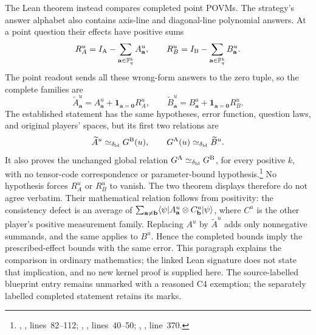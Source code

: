 \documentclass[11pt]{article}
\begin{document}
The Lean theorem instead compares completed point POVMs. The strategy's
answer alphabet also contains axis-line and diagonal-line polynomial
answers. At a point question their effects have positive sums
\[
 R_A^u=I_{\mathrm A}-\sum_{\mathbf a\in\mathbb{F}_q^k}A^u_{\mathbf a},
 \qquad
 R_B^u=I_{\mathrm B}-\sum_{\mathbf a\in\mathbb{F}_q^k}B^u_{\mathbf a}.
\]
The point readout sends all these wrong-form answers to the zero tuple, so
the complete families are
\[
 \widetilde A^u_{\mathbf a}
   =A^u_{\mathbf a}+\mathbf1_{\mathbf a=\mathbf0}R_A^u,
 \qquad
 \widetilde B^u_{\mathbf a}
   =B^u_{\mathbf a}+\mathbf1_{\mathbf a=\mathbf0}R_B^u.
\]
The established statement has the same hypotheses, error function,
question laws, and original players' spaces, but its first two relations are
\[
 \widetilde A^u\simeq_{\delta_{\rm ld}}G^{\mathrm B}(u),
 \qquad
 G^{\mathrm A}(u)\simeq_{\delta_{\rm ld}}\widetilde B^u.
\]
It also proves the unchanged global relation
$G^{\mathrm A}\simeq_{\delta_{\rm ld}}G^{\mathrm B}$, for every positive
$k$, with no tensor-code correspondence or parameter-bound
hypothesis.\footnote{,
, lines~82--112;
, ,
lines~40--50; ,
, line~370.}
No hypothesis forces $R_A^u$ or $R_B^u$ to vanish. The two theorem displays
therefore do not agree verbatim. Their mathematical relation follows from
positivity: the consistency defect is an average of
$\sum_{\mathbf a\ne\mathbf b}
\langle\psi|A^u_{\mathbf a}\otimes C^u_{\mathbf b}|\psi\rangle$,
where $C^u$ is the other player's positive measurement family.
Replacing $A^u$ by $\widetilde A^u$ adds only nonnegative summands,
and the same applies to $B^u$. Hence the completed bounds imply the
prescribed-effect bounds with the same error. This paragraph explains the
comparison in ordinary mathematics; the linked Lean signature does not
state that implication, and no new kernel proof is supplied here. The
source-labelled blueprint entry remains unmarked with a reasoned C4
exemption; the separately labelled completed statement retains its marks.
\end{document}

